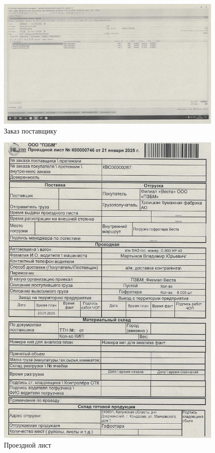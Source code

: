 \clearpage
\clearpage
\begin{figure}
\begin{center}
 \includegraphics[height=0.39\textheight, keepaspectratio]{Pics/IX.1...jpg}
\end{center}
 \caption{Заказ поставщику}
 \label{pic:IX.1..}
\end{figure}

\begin{figure}
\begin{center}
 \includegraphics[height=0.9\textheight, keepaspectratio]{Pics/IX.2.jpg}
\end{center}
 \caption{Проездной лист}
 \label{pic:IX.2}
\end{figure}


